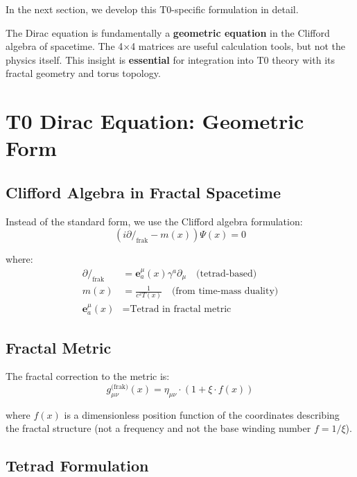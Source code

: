 In the next section, we develop this T0-specific formulation in detail.

\begin{keypoint}
	The Dirac equation is fundamentally a \textbf{geometric equation} in the Clifford algebra of spacetime. The 4×4 matrices are useful calculation tools, but not the physics itself. This insight is \textbf{essential} for integration into T0 theory with its fractal geometry and torus topology.
\end{keypoint}	
	\section{T0 Dirac Equation: Geometric Form}
	
	\subsection{Clifford Algebra in Fractal Spacetime}
	
	Instead of the standard form, we use the Clifford algebra formulation:
	\begin{equation}
		\boxed{(i \partial\!\!\!/_{\text{frak}} - m(x))\Psi(x) = 0}
		\label{eq:t0_dirac}
	\end{equation}
	
	where:
	\begin{align}
		\partial\!\!\!/_{\text{frak}} &= \mathbf{e}^\mu_a(x) \gamma^a \partial_\mu 
		\quad \text{(tetrad-based)} \\
		m(x) &= \frac{1}{c^2 T(x)} \quad \text{(from time-mass duality)} \\
		\mathbf{e}^\mu_a(x) &= \text{Tetrad in fractal metric}
	\end{align}
	
	\subsection{Fractal Metric}
	
	The fractal correction to the metric is:
	\begin{equation}
		g_{\mu\nu}^{\text{(frak)}}(x) = \eta_{\mu\nu} \cdot \left(1 + \xi \cdot f(x)\right)
		\label{eq:fractal_metric}
	\end{equation}

	where $f(x)$ is a dimensionless position function of the coordinates describing the fractal structure (not a frequency and not the base winding number $f = 1/\xi$).
	
	\subsection{Tetrad Formulation}
	
